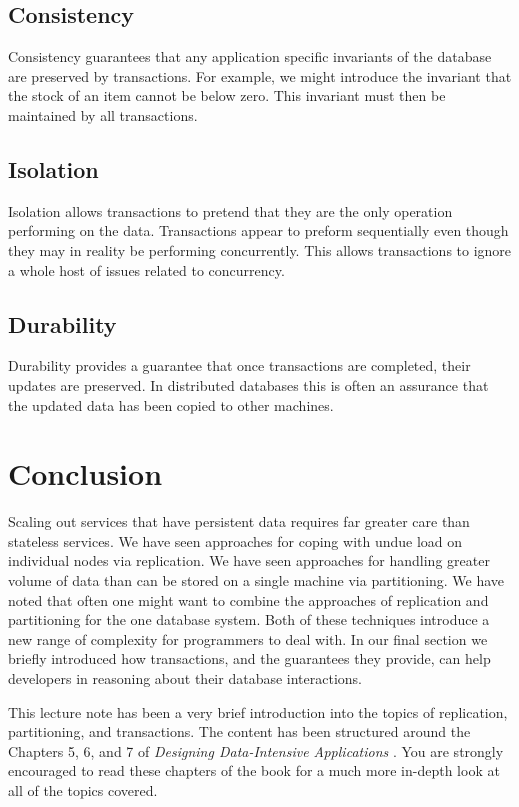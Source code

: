 \subsection{Consistency}
Consistency guarantees that any application specific invariants of the database are preserved by transactions.
For example, we might introduce the invariant that the stock of an item cannot be below zero.
This invariant must then be maintained by all transactions.

\subsection{Isolation}
Isolation allows transactions to pretend that they are the only operation performing on the data.
Transactions appear to preform sequentially even though they may in reality be performing concurrently.
This allows transactions to ignore a whole host of issues related to concurrency.

\subsection{Durability}
Durability provides a guarantee that once transactions are completed,
their updates are preserved.
In distributed databases this is often an assurance that the updated data has been copied to other machines.

\section{Conclusion}

Scaling out services that have persistent data requires far greater care than stateless services.
We have seen approaches for coping with undue load on individual nodes via replication.
We have seen approaches for handling greater volume of data than can be stored on a single machine via partitioning.
We have noted that often one might want to combine the approaches of replication and partitioning for the one database system.
Both of these techniques introduce a new range of complexity for programmers to deal with.
In our final section we briefly introduced how transactions, and the guarantees they provide, can help developers in reasoning about their database interactions.

This lecture note has been a very brief introduction into the topics of replication, partitioning, and transactions.
The content has been structured around the Chapters 5, 6, and 7 of \textit{Designing Data-Intensive Applications} \cite{data-intensive}.
You are strongly encouraged to read these chapters of the book for a much more in-depth look at all of the topics covered.
